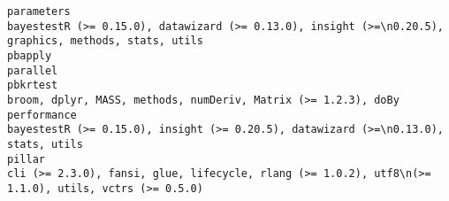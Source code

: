 \documentclass[
  letterpaper,
  DIV=11,
  numbers=noendperiod]{scrreprt}
\begin{document}
\begin{verbatim}
parameters                                                                                                                                                                                                                                                                                                                                                                                                                                                                                                           bayestestR (>= 0.15.0), datawizard (>= 0.13.0), insight (>=\n0.20.5), graphics, methods, stats, utils
pbapply                                                                                                                                                                                                                                                                                                                                                                                                                                                                                                                                                                                                           parallel
pbkrtest                                                                                                                                                                                                                                                                                                                                                                                                                                                                                                                                                    broom, dplyr, MASS, methods, numDeriv, Matrix (>= 1.2.3), doBy
performance                                                                                                                                                                                                                                                                                                                                                                                                                                                                                                                             bayestestR (>= 0.15.0), insight (>= 0.20.5), datawizard (>=\n0.13.0), stats, utils
pillar                                                                                                                                                                                                                                                                                                                                                                                                                                                                                                                 cli (>= 2.3.0), fansi, glue, lifecycle, rlang (>= 1.0.2), utf8\n(>= 1.1.0), utils, vctrs (>= 0.5.0)

\end{verbatim}
\end{document}
